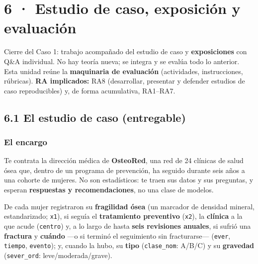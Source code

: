 \documentclass[
  letterpaper,
  DIV=11,
  numbers=noendperiod]{scrartcl}
\begin{document}
\hypertarget{sec-u16}{%
\section{6 · Estudio de caso, exposición y evaluación}\label{sec-u16}}

\begin{tcolorbox}[enhanced jigsaw, breakable, colframe=quarto-callout-note-color-frame, left=2mm, arc=.35mm, colbacktitle=quarto-callout-note-color!10!white, toprule=.15mm, colback=white, coltitle=black, rightrule=.15mm, opacitybacktitle=0.6, title=\textcolor{quarto-callout-note-color}{\faInfo}\hspace{0.5em}{Sobre esta unidad}, titlerule=0mm, toptitle=1mm, bottomtitle=1mm, leftrule=.75mm, bottomrule=.15mm, opacityback=0]

Cierre del Caso 1: trabajo acompañado del estudio de caso y
\textbf{exposiciones} con Q\&A individual. No hay teoría nueva; se
integra y se evalúa todo lo anterior. Esta unidad reúne la
\textbf{maquinaria de evaluación} (actividades, instrucciones,
rúbricas). \textbf{RA implicados:} RA8 (desarrollar, presentar y
defender estudios de caso reproducibles) y, de forma acumulativa,
RA1--RA7.

\end{tcolorbox}

\hypertarget{sec-u16-caso}{%
\subsection{6.1 El estudio de caso (entregable)}\label{sec-u16-caso}}

\hypertarget{el-encargo}{%
\subsubsection{El encargo}\label{el-encargo}}

Te contrata la dirección médica de \textbf{OsteoRed}, una red de 24
clínicas de salud ósea que, dentro de un programa de prevención, ha
seguido durante seis años a una cohorte de mujeres. No son estadísticos:
te traen sus datos y sus preguntas, y esperan \textbf{respuestas y
recomendaciones}, no una clase de modelos.

De cada mujer registraron su \textbf{fragilidad ósea} (un marcador de
densidad mineral, estandarizado; \texttt{x1}), si seguía el
\textbf{tratamiento preventivo} (\texttt{x2}), la \textbf{clínica} a la
que acude (\texttt{centro}) y, a lo largo de hasta \textbf{seis
revisiones anuales}, si sufrió una \textbf{fractura} y \textbf{cuándo}
---o si terminó el seguimiento sin fracturarse--- (\texttt{ever},
\texttt{tiempo}, \texttt{evento}); y, cuando la hubo, su \textbf{tipo}
(\texttt{clase\_nom}: A/B/C) y su \textbf{gravedad}
(\texttt{sever\_ord}: leve/moderada/grave).
\end{document}
